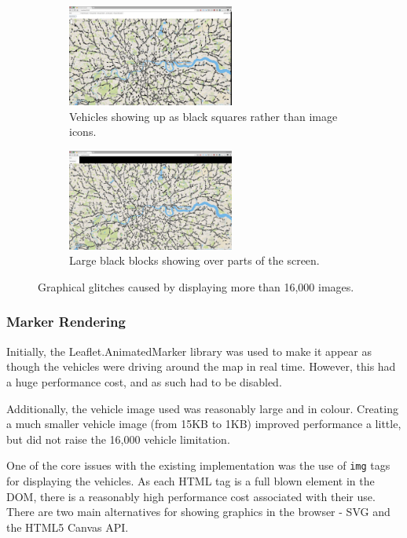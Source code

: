 \documentclass[ %
                    author={Alexander Hill},
                supervisor={Dr. Benjamin Sach},
                    degree={MEng},
                     title={MARMOSET},
                  subtitle={Multi-Agent Route Management using Online Simulation for Efficient Transportation},
                      type={research},
                      year={2016} ]{dissertation}
\begin{document}
\begin{figure}[h]
\centering
\begin{subfigure}[b]{0.4\textwidth}
    \centering
    \includegraphics[height=9em]{glitches-car}
    \caption{Vehicles showing up as black squares rather than image icons.}\label{fig:glitches-car}
\end{subfigure}
\hspace{3em}
\begin{subfigure}[b]{0.4\textwidth}
    \centering
    \includegraphics[height=9em]{glitches-chrome}
    \caption{Large black blocks showing over parts of the screen.}\label{fig:glitches-chrome}
\end{subfigure}
\caption{Graphical glitches caused by displaying more than 16,000 images.}
\end{figure}

\subsubsection{Marker Rendering}

Initially, the Leaflet.AnimatedMarker library was used to make it appear as
though the vehicles were driving around the map in real time. However, this had a
huge performance cost, and as such had to be disabled.

Additionally, the vehicle image used was reasonably large and in colour.
Creating a much smaller vehicle image (from 15KB to 1KB) improved performance a
little, but did not raise the 16,000 vehicle limitation.

One of the core issues with the existing implementation was the use of
\texttt{img} tags for displaying the vehicles. As each HTML tag is a full blown
element in the DOM, there is a reasonably high performance cost associated with
their use. There are two main alternatives for showing graphics in the browser -
SVG and the HTML5 Canvas API.
\end{document}
